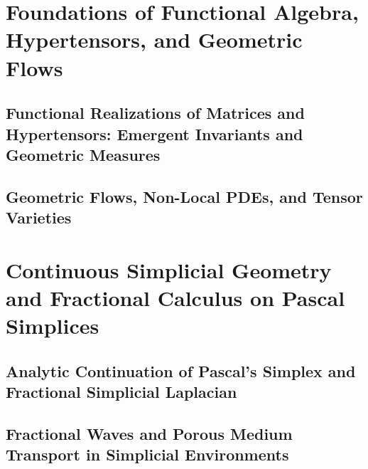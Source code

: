 \documentclass[11pt,a4paper,openright,twoside]{book}
\begin{document}
\tableofcontents

\mainmatter

\part{Foundations of Functional Algebra, Hypertensors, and Geometric Flows}

\chapter[Functional Realizations of Matrices and Hypertensors]{Functional Realizations of Matrices and Hypertensors: Emergent Invariants and Geometric Measures}


\chapter[Geometric Flows and Tensor Varieties]{Geometric Flows, Non-Local PDEs, and Tensor Varieties}


\part{Continuous Simplicial Geometry and Fractional Calculus on Pascal Simplices}

\chapter[Analytic Continuation of Pascal's Simplex]{Analytic Continuation of Pascal's Simplex and Fractional Simplicial Laplacian}


\chapter[Fractional Waves and Porous Medium Transport]{Fractional Waves and Porous Medium Transport in Simplicial Environments}

\end{document}
